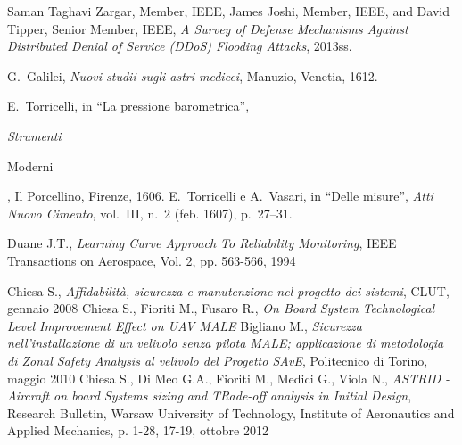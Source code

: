 \begin{thebibliography}{9}
     Saman Taghavi Zargar, Member, IEEE, James Joshi, Member, IEEE, and David Tipper, Senior Member, IEEE, {\em A Survey of Defense Mechanisms Against Distributed Denial of Service (DDoS) Flooding Attacks}, 2013ss.


     G.~Galilei, {\em Nuovi studii sugli astri medicei}, Manuzio, Venetia, 1612.

     E.~Torricelli, in ``La pressione barometrica'', {\em Strumenti

            Moderni}, Il Porcellino, Firenze, 1606.
     E.~Torricelli e A.~Vasari, in ``Delle misure'', {\em Atti Nuovo
            Cimento}, vol.~III, n.~2 (feb. 1607), p.~27--31.

     Duane J.T., \emph{Learning Curve Approach To Reliability Monitoring}, IEEE Transactions on Aerospace, Vol. 2, pp. 563-566, 1994


     Chiesa S., \emph{Affidabilità, sicurezza e manutenzione
        nel progetto dei sistemi}, CLUT, gennaio 2008
    Chiesa S., Fioriti M., Fusaro R., \emph{On Board System
        Technological  Level Improvement Effect on UAV MALE}
     Bigliano M., \emph{Sicurezza nell'installazione di un velivolo
        senza pilota MALE; applicazione di metodologia di Zonal Safety
        Analysis al velivolo del Progetto SAvE}, Politecnico di Torino,
    maggio 2010
     Chiesa S., Di Meo G.A., Fioriti M., Medici G., Viola N.,
    \emph{ASTRID - Aircraft on board Systems sizing and TRade-off
        analysis in Initial Design}, Research Bulletin, Warsaw University
    of Technology, Institute of Aeronautics and Applied Mechanics,
    p. 1-28, 17-19, ottobre 2012

\end{thebibliography}
